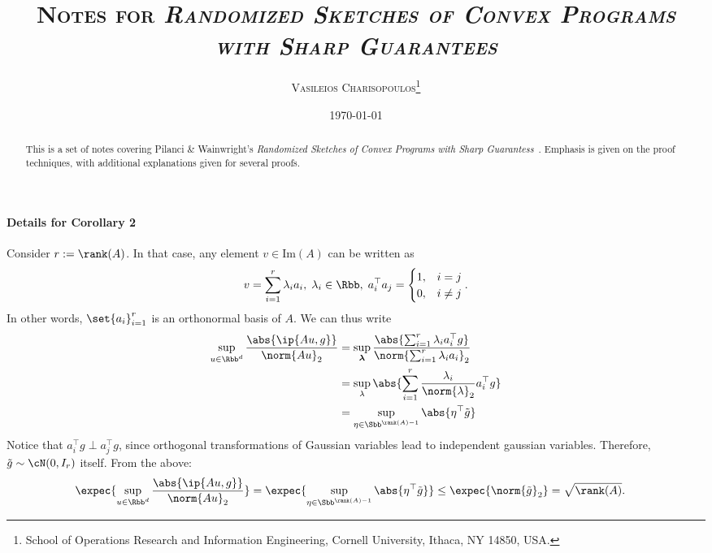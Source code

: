 \documentclass[a4paper]{article}
\begin{document}
\title{\textsc{
	Notes for \textit{Randomized Sketches of Convex Programs with Sharp
	Guarantees}}}
\author{
    \textsc{Vasileios Charisopoulos}\thanks{\quad
        School of Operations Research and Information Engineering, Cornell University,
        Ithaca, NY 14850, USA.
   }}
\date{\today}
\maketitle

\begin{abstract}
This is a set of notes covering Pilanci \& Wainwright's \textit{Randomized
Sketches of Convex Programs with Sharp Guarantess}~\cite{PilWain15}. Emphasis
is given on the proof techniques, with additional explanations given for
several proofs.
\end{abstract}

\paragraph{Details for Corollary 2}
Consider $r := \rank(A)$. In that case, any element $v \in \mathrm{Im}(A)$ can
be written as
\[
    v = \sum_{i=1}^{r} \lambda_i a_i, \; \lambda_i \in \Rbb,
    \; a_i^\top a_j = \begin{cases}
        1, & i = j \\
        0, & i \neq j
    \end{cases}.
\]
In other words, $\set{a_i}_{i=1}^r$ is an orthonormal basis of $A$. We can thus
write
\begin{align*}
    \sup_{u \in \Rbb^d} \frac{\abs{\ip{Au, g}}}{\norm{Au}_2} &=
    \sup_{\bm{\lambda}} \frac{\abs{\sum_{i=1}^r \lambda_i a_i^\top g}}{
        \norm{\sum_{i=1}^r \lambda_i a_i}_2} \\
    &= \sup_{\lambda}
        \abs{\sum_{i=1}^r \frac{\lambda_i}{\norm{\lambda}_2} a_i^\top g} \\
    &= \sup_{\eta \in \Sbb^{\rank(A) - 1}} \abs{\eta^\top \tilde{g}}
\end{align*}
Notice that $a_i^\top g \perp a_j^\top g$, since orthogonal transformations of
Gaussian variables lead to independent gaussian variables. Therefore,
$\tilde{g} \sim \cN(0, I_r)$ itself. From the above:
\begin{align*}
    \expec{\sup_{u \in \Rbb^d} \frac{\abs{\ip{Au, g}}}{\norm{Au}_2}} &=
    \expec{\sup_{\eta \in \Sbb^{\rank(A) - 1}} \abs{\eta^\top \tilde{g}}} \leq
    \expec{\norm{\tilde{g}}_2} =
    \sqrt{\rank(A)}.
\end{align*}



\end{document}
